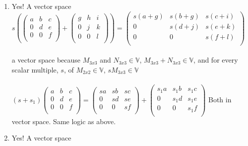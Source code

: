 \documentclass{article}
\begin{document}
\begin{enumerate}
\begin{enumerate}
\item Yes! A vector space
\\ \begin{math}
    s\left(\begin{pmatrix}
    a & b & c \\ 
    0 & d & e \\ 
    0 & 0 & f \\ 
    \end{pmatrix} 
    +\begin{pmatrix}
    g & h & i \\ 
    0 & j & k \\ 
    0 & 0 & l \\ 
    \end{pmatrix}\right) =
    \begin{pmatrix}
    s(a+g) & s(b+g) & s(c+i) \\ 
    0 & s(d+j) & s(e+k) \\ 
    0 & 0 & s(f+l)\\ 
\end{pmatrix}     \end{math}
\\ \\ a vector space because $M_{3x3}$ and $N_{3x3} \in \mathbb{V}$, $M_{3x3} + N_{3x3}\in \mathbb{V}$, and for every scalar multiple, $s$, of $M_{2x2}\in \mathbb{V}$, $sM_{3x3}\in \mathbb{V}$
\\ \\
     \begin{math}
    (s+s_1)\begin{pmatrix}
    a & b & c \\ 
    0 & d & e \\ 
    0 & 0 & f \\ 
    \end{pmatrix} =
    \begin{pmatrix}
    sa & sb & sc \\ 
    0 & sd & se \\ 
    0 & 0 & sf \\ 
    \end{pmatrix} 
    +\begin{pmatrix}
    s_1a & s_1b & s_1c \\ 
    0 & s_1d & s_1e \\ 
    0 & 0 & s_1f \\
    \end{pmatrix}
    \end{math} Both in vector space. Same logic as above.
\item Yes! A vector space

\end{enumerate}
\end{enumerate}
\end{document}
